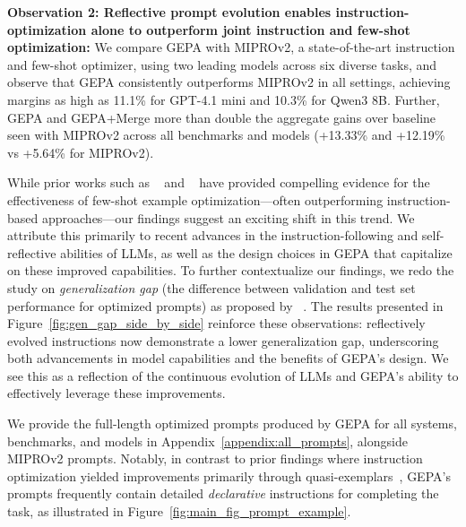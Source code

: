 \documentclass{article} %
\begin{document}
\textbf{Observation 2: Reflective prompt evolution enables instruction-optimization alone to outperform joint instruction and few-shot optimization:} We compare GEPA with MIPROv2, a state-of-the-art instruction and few-shot optimizer, using two leading models across six diverse tasks, and observe that GEPA consistently outperforms MIPROv2 in all settings, achieving margins as high as 11.1\% for GPT-4.1 mini and 10.3\% for Qwen3 8B. Further, GEPA and GEPA+Merge more than double the aggregate gains over baseline seen with MIPROv2 across all benchmarks and models (+13.33\% and +12.19\% vs +5.64\% for MIPROv2).

While prior works such as ~\citet{miprov2} and ~\citet{tbsm} have provided compelling evidence for the effectiveness of few-shot example optimization—often outperforming instruction-based approaches—our findings suggest an exciting shift in this trend. We attribute this primarily to recent advances in the instruction-following and self-reflective abilities of LLMs, as well as the design choices in GEPA that capitalize on these improved capabilities. To further contextualize our findings, we redo the study on \textit{generalization gap} (the difference between validation and test set performance for optimized prompts) as proposed by ~\citet{tbsm}. The results presented in Figure~\ref{fig:gen_gap_side_by_side} reinforce these observations: reflectively evolved instructions now demonstrate a lower generalization gap, underscoring both advancements in model capabilities and the benefits of GEPA’s design. We see this as a reflection of the continuous evolution of LLMs and GEPA's ability to effectively leverage these improvements.

We provide the full-length optimized prompts produced by GEPA for all systems, benchmarks, and models in Appendix~\ref{appendix:all_prompts}, alongside MIPROv2 prompts. Notably, in contrast to prior findings where instruction optimization yielded improvements primarily through quasi-exemplars~\citep{tbsm}, GEPA's prompts frequently contain detailed \textit{declarative} instructions for completing the task, as illustrated in Figure~\ref{fig:main_fig_prompt_example}.
\end{document}
